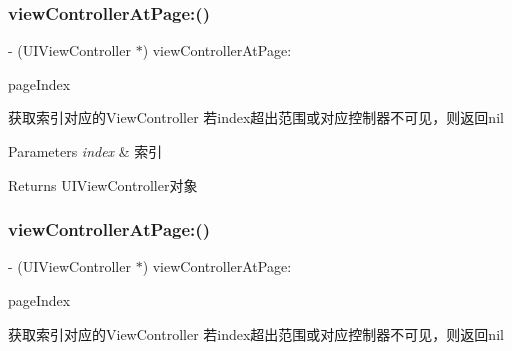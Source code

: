 \subsubsection{\texorpdfstring{view\+Controller\+At\+Page\+:()}{viewControllerAtPage:()}\hspace{0.1cm}{\footnotesize\ttfamily [2/3]}}
{\footnotesize\ttfamily -\/ (U\+I\+View\+Controller $\ast$) view\+Controller\+At\+Page\+: \begin{DoxyParamCaption}\item[{(N\+S\+U\+Integer)}]{page\+Index }\end{DoxyParamCaption}}

获取索引对应的\+View\+Controller 若index超出范围或对应控制器不可见，则返回nil


\begin{DoxyParams}{Parameters}
{\em index} & 索引\\
\hline
\end{DoxyParams}
\begin{DoxyReturn}{Returns}
U\+I\+View\+Controller对象 
\end{DoxyReturn}
\mbox{\label{interface_v_t_content_view_ae81362c80f8f700ad3c69d814da4ca9b}} 
\subsubsection{\texorpdfstring{view\+Controller\+At\+Page\+:()}{viewControllerAtPage:()}\hspace{0.1cm}{\footnotesize\ttfamily [3/3]}}
{\footnotesize\ttfamily -\/ (U\+I\+View\+Controller $\ast$) view\+Controller\+At\+Page\+: \begin{DoxyParamCaption}\item[{(N\+S\+U\+Integer)}]{page\+Index }\end{DoxyParamCaption}}

获取索引对应的\+View\+Controller 若index超出范围或对应控制器不可见，则返回nil


